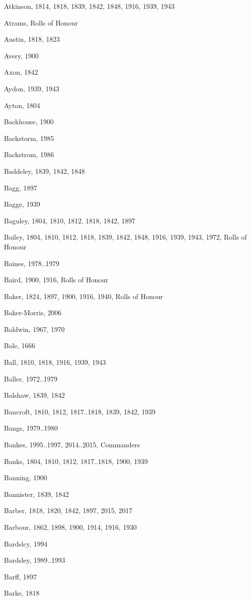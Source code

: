 \begin{theindex}
\item Atkinson, 1814, 1818, 1839, 1842, 1848, 1916, 1939, 1943
\item Atrams, Rolls of Honour
\item Austin, 1818, 1823
\item Avery, 1900
\item Axon, 1842
\item Aydon, 1939, 1943
\item Ayton, 1804
\item Backhouse, 1900
\item Backstorm, 1985
\item Backstrom, 1986
\item Baddeley, 1839, 1842, 1848
\item Bagg, 1897
\item Bagge, 1939
\item Baguley, 1804, 1810, 1812, 1818, 1842, 1897
\item Bailey, 1804, 1810, 1812, 1818, 1839, 1842, 1848, 1916, 1939, 1943, 1972, Rolls of Honour
\item Baines, 1978..1979
\item Baird, 1900, 1916, Rolls of Honour
\item Baker, 1824, 1897, 1900, 1916, 1940, Rolls of Honour
\item Baker-Morris, 2006
\item Baldwin, 1967, 1970
\item Bale, 1666
\item Ball, 1810, 1818, 1916, 1939, 1943
\item Baller, 1972..1979
\item Balshaw, 1839, 1842
\item Bancroft, 1810, 1812, 1817..1818, 1839, 1842, 1939
\item Bangs, 1979..1980
\item Bankes, 1995..1997, 2014..2015, Commanders
\item Banks, 1804, 1810, 1812, 1817..1818, 1900, 1939
\item Banning, 1900
\item Bannister, 1839, 1842
\item Barber, 1818, 1820, 1842, 1897, 2015, 2017
\item Barbour, 1862, 1898, 1900, 1914, 1916, 1930
\item Bardslcy, 1994
\item Bardsley, 1989..1993
\item Barff, 1897
\item Barke, 1818

\end{theindex}
